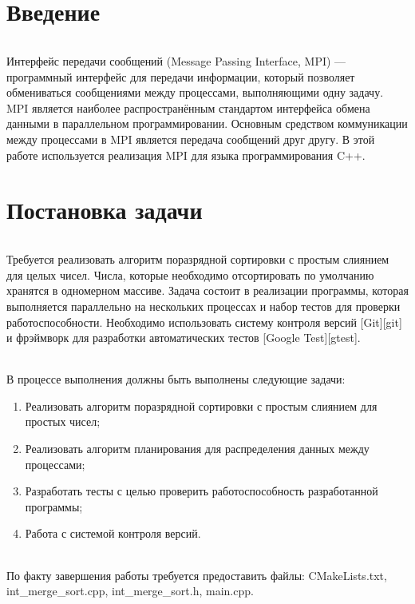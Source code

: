 \documentclass[12pt,a4paper]{article}
\begin{document}
\part*{Введение}
\paragraph{}Интерфейс передачи сообщений (Message Passing Interface, MPI) — программный интерфейс для передачи информации, который позволяет обмениваться сообщениями между процессами, выполняющими одну задачу. MPI является наиболее распространённым стандартом интерфейса обмена данными в параллельном программировании. Основным средством коммуникации между процессами в MPI является передача сообщений друг другу. В этой работе используется реализация MPI для языка программирования C++.

\part*{Постановка задачи}
\paragraph{}Требуется реализовать алгоритм поразрядной сортировки с простым слиянием для целых чисел. Числа, которые необходимо отсортировать по умолчанию хранятся в одномерном массиве. Задача состоит в реализации программы, которая выполняется параллельно на нескольких процессах и набор тестов для проверки работоспособности. Необходимо использовать систему контроля версий [Git][git] и фрэймворк для разработки автоматических тестов [Google Test][gtest].
\paragraph{}В процессе выполнения должны быть выполнены следующие задачи:
\begin{enumerate}
\item Реализовать алгоритм поразрядной сортировки с простым слиянием для простых чисел;
\item Реализовать алгоритм планирования для распределения данных между процессами;
\item Разработать тесты с целью проверить работоспособность разработанной программы;
\item Работа с системой контроля версий.
\end{enumerate}
\paragraph{}По факту завершения работы требуется предоставить файлы: CMakeLists.txt, int\_merge\_sort.cpp, int\_merge\_sort.h, main.cpp.
\end{document}
